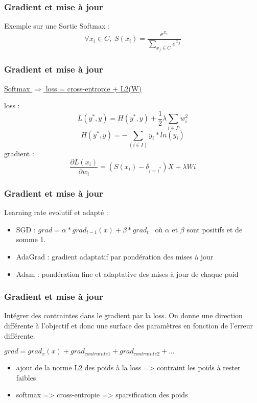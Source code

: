 
\begin{frame}
  \frametitle{Gradient et mise à jour}
  Exemple sur une Sortie Softmax :
  \[
  \forall x_i \in C,\; S(x_i) = \frac{e^{x_i}}{\sum_{x_j \in C}e^{x_j}}
  \]
\end{frame}

\begin{frame}
  \frametitle{Gradient et mise à jour}
  \begin{center}
    \underline{Softmax $\Rightarrow$ loss = cross-entropie + L2(W)}
  \end{center}
  loss :
  \[
  L(y^*,y) = H(y^*,y) + \frac{1}{2}\lambda\sum_{i \in P}w_i^2
  \]
  \[
  H(y^*,y) = -\sum_{(i \in I)}y_i*ln(y_i)
  \]
  gradient :
  \[
  \frac{\partial{L(x_i)}}{\partial{w_i}} = ( S(x_i) - \delta_{i=i^*} )X + \lambda Wi
  \]
\end{frame}

\begin{frame}
  \frametitle{Gradient et mise à jour}
  Learning rate evolutif et adapté :
  \begin{itemize}
  \item SGD : $grad = \alpha*grad_{t-1}(x)+\beta*grad_t \;\;\;$où $\alpha$ et $\beta$ sont positifs et de somme 1.
  \item AdaGrad : gradient adaptatif par pondération des mises à jour
  \item Adam : pondération fine et adaptative des mises à jour de chaque poid
  \end{itemize}
\end{frame}


\begin{frame}
  \frametitle{Gradient et mise à jour}
  Intégrer des contraintes dans le gradient par la loss. On donne une direction différente à l'objectif et donc une surface des paramètres en fonction de l'erreur différente.
  \begin{center}
    $grad = grad_x(x) + grad_{contrainte 1} + grad_{contrainte 2} + ...$
  \end{center}
  \begin{itemize}
  \item ajout de la norme L2 des poids à la loss => contraint les poids à rester faibles
  \item softmax => cross-entropie => sparsification des poids
  \end{itemize}
\end{frame}

